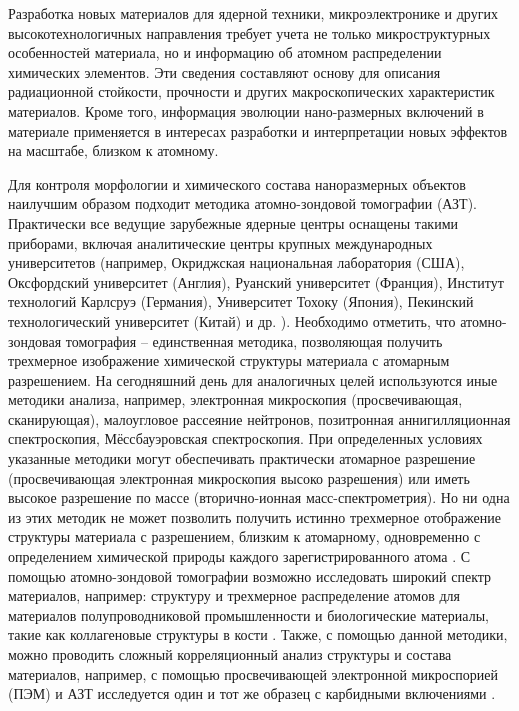 
{\actuality} Разработка новых материалов для ядерной техники, микроэлектронике и других высокотехнологичных направления требует учета не только микроструктурных особенностей материала, но и информацию об атомном распределении химических элементов. Эти сведения составляют основу для описания радиационной стойкости, прочности и других макроскопических характеристик материалов. Кроме того, информация эволюции нано-размерных включений в материале применяется в интересах разработки и интерпретации новых эффектов на масштабе, близком к атомному.

Для контроля морфологии и химического состава наноразмерных объектов наилучшим образом подходит методика атомно-зондовой томографии (АЗТ). Практически все ведущие зарубежные ядерные центры оснащены такими приборами, включая аналитические центры крупных международных университетов (например, Окриджская национальная лаборатория (США), Оксфордский университет (Англия), Руанский университет (Франция), Институт технологий Карлсруэ (Германия), Университет Тохоку (Япония), Пекинский технологический университет (Китай) и др. \cite{APTlist}). Необходимо отметить, что атомно-зондовая томография – единственная методика, позволяющая получить трехмерное изображение химической структуры материала с атомарным разрешением. На сегодняшний день для аналогичных целей используются иные методики анализа, например, электронная микроскопия (просвечивающая, сканирующая), малоугловое рассеяние нейтронов, позитронная аннигилляционная спектроскопия, Мёссбауэровская спектроскопия. При определенных условиях указанные методики могут обеспечивать практически атомарное разрешение (просвечивающая электронная микроскопия высоко разрешения) или иметь высокое разрешение по массе (вторично-ионная масс-спектрометрия). Но ни одна из этих методик не может позволить получить истинно трехмерное отображение структуры материала с разрешением, близким к атомарному, одновременно с определением химической природы каждого зарегистрированного атома \cite{GaultBOOK}. С помощью атомно-зондовой томографии возможно исследовать широкий спектр материалов, например: структуру и трехмерное распределение атомов для материалов полупроводниковой промышленности \cite{Ulfig23} и биологические материалы, такие как коллагеновые структуры в кости \cite{Lee21}. Также, с помощью данной методики, можно проводить сложный корреляционный анализ структуры и состава материалов, например, с помощью просвечивающей электронной микроспорией (ПЭМ) и АЗТ исследуется один и тот же образец с карбидными включениями \cite{Liebscher18}.

